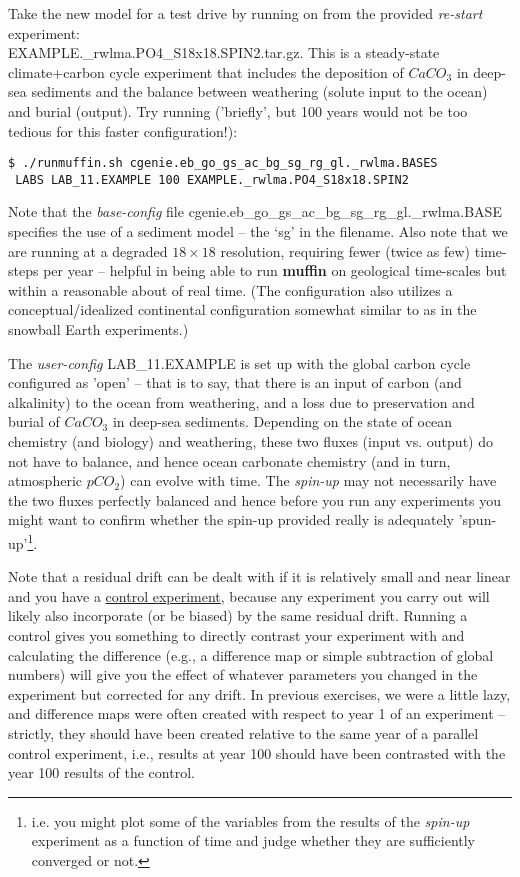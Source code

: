\documentclass[11pt,fleqn]{book} %
\begin{document}
\noindent Take the new model for a test drive by running on from the provided \textit{re-start} experiment: \\ \textsf{\footnotesize EXAMPLE.\_rwlma.PO4\_S18x18.SPIN2.tar.gz}. This is a steady-state climate+carbon cycle experiment that includes the deposition of \(CaCO_{3}\) in deep-sea sediments and the balance between weathering (solute input to the ocean) and burial (output). Try running ('briefly', but 100 years would not be too tedious for this faster configuration!):
\vspace{-2mm}\begin{verbatim}
$ ./runmuffin.sh cgenie.eb_go_gs_ac_bg_sg_rg_gl._rwlma.BASES
 LABS LAB_11.EXAMPLE 100 EXAMPLE._rwlma.PO4_S18x18.SPIN2
\end{verbatim}\vspace{-2mm}
Note that the \textit{base-config} file \textsf{\footnotesize cgenie.eb\_go\_gs\_ac\_bg\_sg\_rg\_gl.\_rwlma.BASE} specifies the use of a sediment model -- the ‘\textsf{\footnotesize sg}’ in the filename.
Also note that we are running at a degraded \(18\times18\) resolution, requiring fewer (twice as few) time-steps per year -- helpful in being able to run \textbf{muffin} on geological time-scales but within a reasonable about of real time. (The configuration also utilizes a conceptual/idealized continental configuration somewhat similar to as in the snowball Earth experiments.)

The \textit{user-config} \textsf{\footnotesize LAB\_11.EXAMPLE } is set up with the global carbon cycle configured as 'open' -- that is to say, that there is an input of carbon (and alkalinity) to the ocean from weathering, and a loss due to preservation and burial of \(CaCO_{3}\) in deep-sea sediments. Depending on the state of ocean chemistry (and biology) and weathering, these two fluxes (input vs. output) do not have to balance, and hence ocean carbonate chemistry (and in turn, atmospheric \(pCO_{2}\)) can evolve with time. The \textit{spin-up} may not necessarily have the two fluxes perfectly balanced and hence before you run any experiments you might want to confirm whether the spin-up provided really is adequately 'spun-up'\footnote{i.e. you might plot some of the variables from the results of the \textit{spin-up}  experiment as a function of time and judge whether they are sufficiently converged or not.}.

Note that a residual drift can be dealt with if it is relatively small and near linear and you have a \uline{control experiment}, because any experiment you carry out will likely also incorporate (or be biased) by the same residual drift. Running a control gives you something to directly contrast  your experiment with and calculating the difference (e.g., a difference map or simple subtraction of global numbers) will give you the effect of whatever parameters you changed in the experiment but corrected for any drift. In previous exercises, we were a little lazy, and difference maps were often created with respect to year 1 of an experiment -- strictly, they should have been created relative to the same year of a parallel control experiment, i.e., results at year 100 should have been contrasted with the year 100 results of the control.
\end{document}
